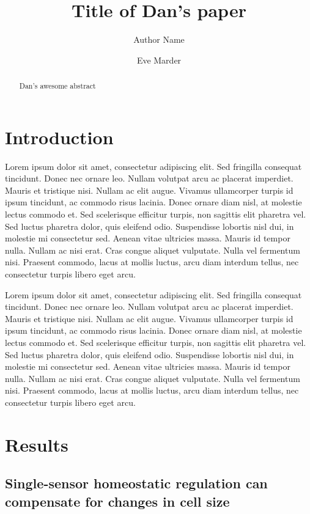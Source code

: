 \documentclass[9pt,lineno]{elife}
\title{Title of Dan's paper}
\author[1]{Author Name}
\author[1]{Eve Marder}
\affil[1]{Volen Center and Biology Department, Brandeis University, Waltham MA 02454 USA}
\begin{document}
\maketitle

\begin{abstract}
Dan's awesome abstract
\end{abstract}


\section*{Introduction}

Lorem ipsum dolor sit amet, consectetur adipiscing elit. Sed fringilla consequat tincidunt. Donec nec ornare leo. Nullam volutpat arcu ac placerat imperdiet. Mauris et tristique nisi. Nullam ac elit augue. Vivamus ullamcorper turpis id ipsum tincidunt, ac commodo risus lacinia. Donec ornare diam nisl, at molestie lectus commodo et. Sed scelerisque efficitur turpis, non sagittis elit pharetra vel. Sed luctus pharetra dolor, quis eleifend odio. Suspendisse lobortis nisl dui, in molestie mi consectetur sed. Aenean vitae ultricies massa. Mauris id tempor nulla. Nullam ac nisi erat. Cras congue aliquet vulputate. Nulla vel fermentum nisi. Praesent commodo, lacus at mollis luctus, arcu diam interdum tellus, nec consectetur turpis libero eget arcu.

Lorem ipsum dolor sit amet, consectetur adipiscing elit. Sed fringilla consequat tincidunt. Donec nec ornare leo. Nullam volutpat arcu ac placerat imperdiet. Mauris et tristique nisi. Nullam ac elit augue. Vivamus ullamcorper turpis id ipsum tincidunt, ac commodo risus lacinia. Donec ornare diam nisl, at molestie lectus commodo et. Sed scelerisque efficitur turpis, non sagittis elit pharetra vel. Sed luctus pharetra dolor, quis eleifend odio. Suspendisse lobortis nisl dui, in molestie mi consectetur sed. Aenean vitae ultricies massa. Mauris id tempor nulla. Nullam ac nisi erat. Cras congue aliquet vulputate. Nulla vel fermentum nisi. Praesent commodo, lacus at mollis luctus, arcu diam interdum tellus, nec consectetur turpis libero eget arcu.

\section{Results}


\subsection{Single-sensor homeostatic regulation can compensate for changes in cell size}
\end{document}
